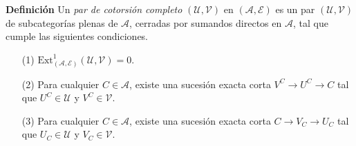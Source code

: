 \documentclass[preview]{standalone}
\begin{document}
\begin{center}
\justifying \textbf{Definición} Un \emph{par de cotorsión completo} $(\mathcal{U}, \mathcal{V})$ en $(\mathscr{A}, \mathscr{E})$ es un par $(\mathcal{U}, \mathcal{V})$ de subcategorías plenas de $\mathscr{A}$, cerradas por sumandos directos en $\mathscr{A}$, tal que cumple las siguientes condiciones.\begin{enumerate} \item[(1)] $\text{Ext}^1_{(\mathscr{A}, \mathscr{E})} (\mathcal{U}, \mathcal{V}) = 0$. \item[(2)] Para cualquier $C\in\mathscr{A}$, existe una sucesión exacta corta $V^C\to U^C\to C$ tal que $U^C\in\mathcal{U}$ y $V^C\in\mathcal{V}$. \item[(3)] Para cualquier $C\in\mathscr{A}$, existe una sucesión exacta corta $C\to V_C\to U_C$ tal que $U_C\in\mathcal{U}$ y $V_C\in\mathcal{V}$. \end{enumerate}
\end{center}
\end{document}
